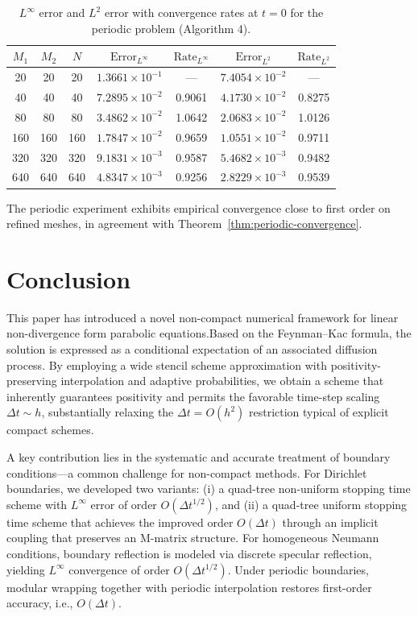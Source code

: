 \documentclass[11pt]{article}
\theoremstyle{mythm}
\theoremstyle{definition}
\begin{document}
	\begin{table}[htb]
		\centering
		\caption{$L^{\infty}$ error and $L^2$ error with convergence rates at $t=0$ for the periodic problem (Algorithm 4).}
		\label{tab:periodic_consistent}
		\small
		\begin{tabular}{@{}ccccccc@{}}
			\toprule
			\(M_1\) & \(M_2\) & \(N\) &$\text{Error}_{L^\infty}$ & $\text{Rate}_{L^\infty}$ & $\text{Error}_{L^2}$ & $\text{Rate}_{L^2}$ \\
			\midrule
			20  & 20  & 20  & \(1.3661 \times 10^{-1}\) & --- & \(7.4054 \times 10^{-2}\) & --- \\
			40  & 40  & 40  & \(7.2895 \times 10^{-2}\) & 0.9061 & \(4.1730 \times 10^{-2}\) & 0.8275 \\
			80  & 80  & 80  & \(3.4862 \times 10^{-2}\) & 1.0642 & \(2.0683 \times 10^{-2}\) & 1.0126 \\
			160 & 160 & 160 & \(1.7847 \times 10^{-2}\) & 0.9659 & \(1.0551 \times 10^{-2}\) & 0.9711 \\
			320 & 320 & 320 & \(9.1831 \times 10^{-3}\) & 0.9587 & \(5.4682 \times 10^{-3}\) & 0.9482 \\
			640 & 640 & 640 & \(4.8347 \times 10^{-3}\) & 0.9256 & \(2.8229 \times 10^{-3}\) & 0.9539 \\
			\bottomrule
		\end{tabular}
	\end{table}
	\newpage
	The periodic experiment exhibits empirical convergence close to first order on refined meshes, in agreement with Theorem~\ref{thm:periodic-convergence}.
	
	\section{Conclusion}
	\label{sec5}
	This paper has introduced a novel non-compact numerical framework for linear non-divergence form parabolic equations.Based on the Feynman–Kac formula, the solution is expressed as a conditional expectation of an associated diffusion process. By employing a wide stencil scheme approximation with positivity-preserving interpolation and adaptive probabilities, we obtain a scheme that inherently guarantees positivity and permits the favorable time-step scaling $\Delta t \sim h$, substantially relaxing the $\Delta t = O(h^2)$ restriction typical of explicit compact schemes.
	
	A key contribution lies in the systematic and accurate treatment of boundary conditions---a common challenge for non-compact methods. For Dirichlet boundaries, we developed two variants:  
	(i) a quad-tree non-uniform stopping time scheme with \(L^\infty\) error of order \(O(\Delta t^{1/2})\), and  
	(ii) a quad-tree uniform stopping time scheme that achieves the improved order \(O(\Delta t)\) through an implicit coupling that preserves an M-matrix structure.  
	For homogeneous Neumann conditions, boundary reflection is modeled via discrete specular reflection, yielding \(L^\infty\) convergence of order \(O(\Delta t^{1/2})\). Under periodic boundaries, modular wrapping together with periodic interpolation restores first-order accuracy, i.e., \(O(\Delta t)\).
	
\end{document}

